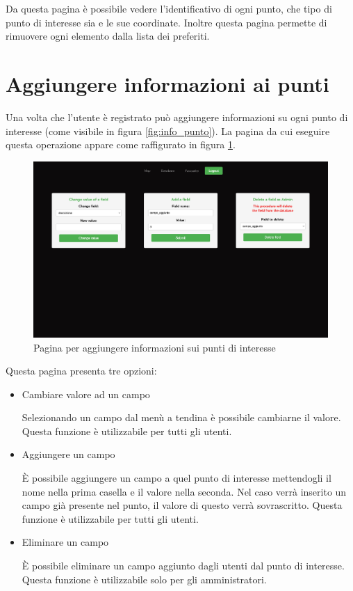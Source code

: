 Da questa pagina è possibile vedere l'identificativo di ogni punto, che tipo di punto di interesse sia e le sue coordinate. Inoltre questa pagina permette di rimuovere ogni elemento dalla lista dei preferiti.

\section{Aggiungere informazioni ai punti}
Una volta che l'utente è registrato può aggiungere informazioni su ogni punto di interesse (come visibile in figura \ref{fig:info_punto}). La pagina da cui eseguire questa operazione appare come raffigurato in figura \ref{fig:extra_field}.

\begin{figure}[h]
\begin{center} 
\includegraphics[width=13cm]{images/Extra_field.jpg}
\caption[Pagina per aggiungere informazioni sui punti di interesse]{Pagina per aggiungere informazioni sui punti di interesse}\label{fig:extra_field}
\end{center}
\end{figure}

Questa pagina presenta tre opzioni:

\begin{itemize}
    \item Cambiare valore ad un campo

    Selezionando un campo dal menù a tendina è possibile cambiarne il valore. Questa funzione è utilizzabile per tutti gli utenti.

    \item Aggiungere un campo

    È possibile aggiungere un campo a quel punto di interesse mettendogli il nome nella prima casella e il valore nella seconda. Nel caso verrà inserito un campo già presente nel punto, il valore di questo verrà sovrascritto. Questa funzione è utilizzabile per tutti gli utenti.

    \item Eliminare un campo

    È possibile eliminare un campo aggiunto dagli utenti dal punto di interesse. Questa funzione è utilizzabile solo per gli amministratori.
\end{itemize}
